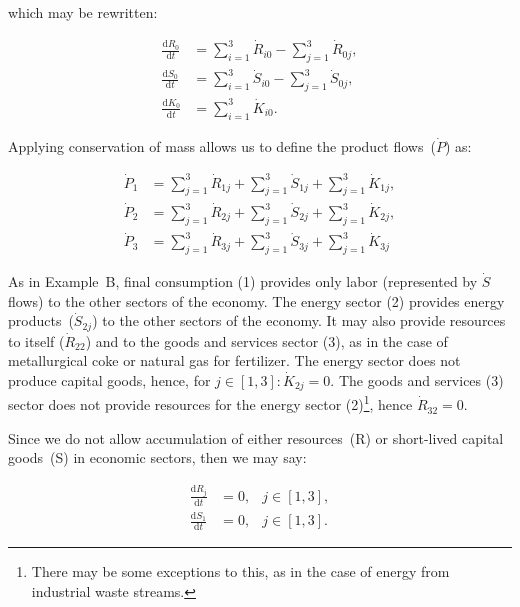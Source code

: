 \noindent{}which may be rewritten:

\begin{align}
\label{eq:C_dR0a}
	\frac{\mathrm{d}R_{0}}{\mathrm{d}t}	&
	= \sum_{i = 1}^{3}\dot{R}_{i0}
	- \sum_{j = 1}^{3}\dot{R}_{0j},				\\
\label{eq:C_dS0a}
	\frac{\mathrm{d}S_{0}}{\mathrm{d}t}	&
	= \sum_{i = 1}^{3}\dot{S}_{i0}
	- \sum_{j = 1}^{3}\dot{S}_{0j},				\\
\label{eq:C_dK0a}
	\frac{\mathrm{d}K_{0}}{\mathrm{d}t}	&
	= \sum_{i = 1}^{3}\dot{K}_{i0}.
\end{align}

Applying conservation of mass
allows us to define the
product flows~($\dot{P}$) as:

\begin{align}
\label{eq:C_P1_def}
	\dot{P}_{1}										&
	= \sum_{j = 1}^{3}\dot{R}_{1j}
	+ \sum_{j = 1}^{3}\dot{S}_{1j}
	+ \sum_{j = 1}^{3}\dot{K}_{1j},	\\
\label{eq:C_P2_def}
	\dot{P}_{2}										&
	= \sum_{j = 1}^{3}\dot{R}_{2j}
	+ \sum_{j = 1}^{3}\dot{S}_{2j}
	+ \sum_{j = 1}^{3}\dot{K}_{2j},	\\
\label{eq:C_P3_def}							
	\dot{P}_{3}										&
	= \sum_{j = 1}^{3}\dot{R}_{3j}
	+ \sum_{j = 1}^{3}\dot{S}_{3j}
	+ \sum_{j = 1}^{3}\dot{K}_{3j}
\end{align}

As in Example~B, final consumption (1) provides 
only labor (represented by $\dot{S}$ flows)
to the other sectors of the economy.
The energy sector (2) provides 
energy products~($\dot{S}_{2j}$) to the other
sectors of the economy. 
It may also provide resources to itself ($\dot{R}_{22}$)
and to the goods and services sector (3), 
as in the case of metallurgical coke or 
natural gas for fertilizer.
The energy sector does not produce capital goods,
hence,
for $j \in [1,3]: \dot{K}_{2j} = 0$.
The goods and services (3) sector does not provide
resources for the energy sector (2)\footnote{There
may be some exceptions to this, as in the case of
energy from industrial waste streams.},
hence $\dot{R}_{32} = 0$.

Since we do not allow accumulation of either
resources~(R) or short-lived capital goods~(S) in
economic sectors,
then we may say:

\begin{align}\label{eq:C_dR_and_dS_zero}
	\frac{\mathrm{d}R_{j}}{\mathrm{d}t}			&
	= 0,																	&
	j \in [1,3],														\\
	\frac{\mathrm{d}S_{1}}{\mathrm{d}t} 		&
	= 0,																	&
	j \in [1,3].															
\end{align}

